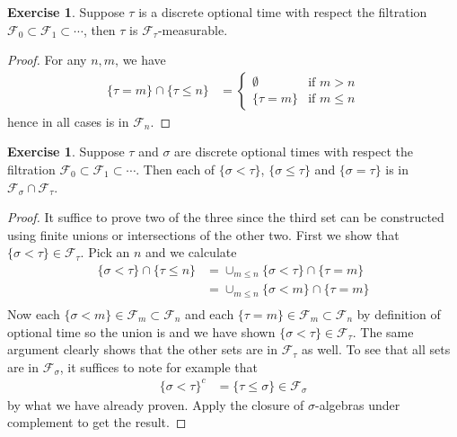 \documentclass{amsart}
\theoremstyle{remark}
\theoremstyle{definition}
\newtheorem{ex}[thm]{Exercise}
\begin{document}
\begin{ex}Suppose $\tau$ is a discrete optional
  time with respect the filtration $\mathcal{F}_0 \subset
  \mathcal{F}_1 \subset \cdots$, then $\tau$ is $\mathcal{F}_\tau$-measurable.
\end{ex}
\begin{proof}
For any $n, m$, we have 
\begin{align*}
\lbrace \tau = m \rbrace  \cap \lbrace \tau \leq n \rbrace &=
\begin{cases}
\emptyset & \text{if $m > n$} \\
\lbrace \tau = m \rbrace & \text{if $m\leq n$}
\end{cases}
\end{align*}
hence in all cases is in $\mathcal{F}_n$.
\end{proof}

\begin{ex}Suppose $\tau$ and $\sigma$ are discrete optional
  times with respect the filtration $\mathcal{F}_0 \subset
  \mathcal{F}_1 \subset \cdots$. Then each of $\lbrace \sigma < \tau
  \rbrace$, $\lbrace \sigma \leq \tau
  \rbrace$ and $\lbrace \sigma = \tau
  \rbrace$ is in $\mathcal{F}_{\sigma} \cap \mathcal{F}_{\tau}$.
\end{ex}
\begin{proof}
It suffice to prove two of the three since the third set can be
constructed using finite unions or intersections of the other two.
First we show that $\lbrace \sigma < \tau \rbrace \in
\mathcal{F}_\tau$.
Pick an $n$ and we calculate
\begin{align*}
\lbrace \sigma < \tau \rbrace \cap \lbrace \tau \leq n \rbrace &=
\cup_{m\leq n}\lbrace \sigma < \tau \rbrace \cap \lbrace \tau = m
\rbrace \\
&= \cup_{m\leq n}\lbrace \sigma < m \rbrace \cap \lbrace \tau = m
\rbrace \\
\end{align*}
Now each $\lbrace \sigma < m \rbrace \in \mathcal{F}_m \subset
\mathcal{F}_n$ and each $\lbrace \tau = m
\rbrace \in \mathcal{F}_m \subset
\mathcal{F}_n$ by definition of optional time so the union is and we
have shown $\lbrace \sigma < \tau \rbrace \in \mathcal{F}_\tau$.  The
same argument clearly shows that the other sets are in
$\mathcal{F}_\tau$ as well.  To see that all sets are in
$\mathcal{F}_\sigma$, it suffices to note for example that 
\begin{align*}
\lbrace \sigma < \tau \rbrace^c &= \lbrace \tau \leq \sigma \rbrace
\in \mathcal{F}_\sigma
\end{align*}
by what we have already proven. Apply the closure of $\sigma$-algebras
under complement to get the result.
\end{proof}
\end{document}
